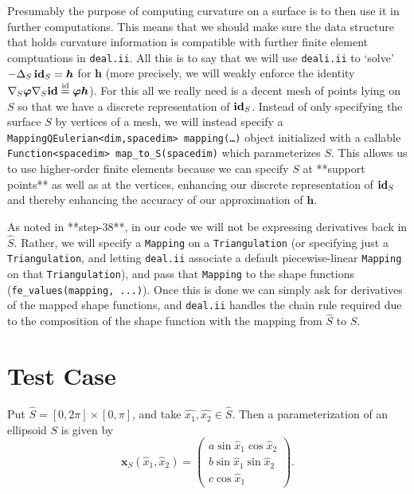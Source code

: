 \documentclass[10pt]{article}
\newcommand{\mbf}[1]{\boldsymbol{#1}}
\begin{document}
Presumably the purpose of computing curvature on a surface is to then use it in
further computations.  This means that we should make sure the data structure that holds
curvature information is compatible with further finite element comptuations
in \texttt{deal.ii}.  All this is to say that we will use \texttt{deali.ii} to
`solve' $- \Delta_S \, \text{\bf id}_S = \mbf{h}$ for $\mbf{h}$ (more
precisely, we will weakly enforce the identity $\nabla_S \boldsymbol{\varphi}
\nabla_S \text{\bf id} \overset{\text{id}}{=} \mbf{\varphi}\mbf{h}$).  For this
all we really need is a decent mesh of points lying on $S$ so that we have a
discrete representation of $\text{\bf id}_S$.  Instead of only specifying the
surface $S$ by vertices of a mesh, we will instead specify a
\texttt{MappingQEulerian<dim,spacedim> mapping(\dots)} object initialized with a callable
\texttt{Function<spacedim> map\_to\_S(spacedim)} which parameterizes $S$.  This
allows us to use higher-order finite elements because we can specify $S$ at
**support points** as well as at the vertices, enhancing our discrete
representation of $\text{\bf id}_S$ and thereby enhancing the accuracy of our
approximation of $\mbf{h}$. 

As noted in **step-38**, in our code we will not be expressing derivatives back in
$\hat{S}$.  Rather, we will specify a \texttt{Mapping} on a
\texttt{Triangulation} (or specifying just a \texttt{Triangulation}, and
letting \texttt{deal.ii} associate a default piecewise-linear \texttt{Mapping}
on that \texttt{Triangulation}), and pass that \texttt{Mapping} to the shape
functions (\texttt{fe\_values(mapping, ...)}).  Once this is done we can simply
ask for derivatives of the mapped shape functions, and \texttt{deal.ii} handles
the chain rule required due to the composition of the shape function with the
mapping from $\hat{S}$ to $S$.


\section*{Test Case}

Put $\hat{S} = [0,2\pi] \times [0, \pi]$, and take $\hat{x_1}, \hat{x_2} \in
\hat{S}$.  Then a parameterization of an ellipsoid $S$ is given by
\[  \mbf{x}_{S}(\hat{x}_1, \hat{x}_2) = 
   \left( \begin{array}{c} 
      a\sin \hat{x}_1 \cos \hat{x}_2 \\
      b\sin \hat{x}_1 \sin \hat{x}_2 \\
            c\cos\hat{x}_1 
   \end{array} \right).
\]
\end{document}

